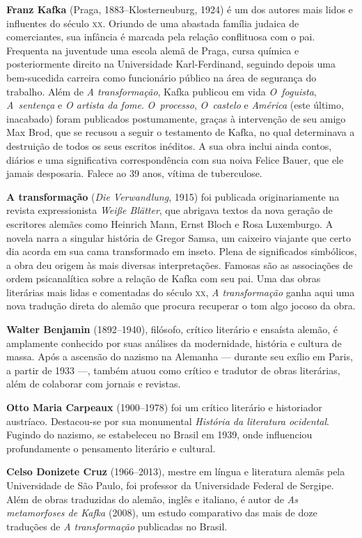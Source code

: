 \textbf{Franz Kafka} (Praga, 1883--Klosterneuburg, 1924) é um dos autores mais lidos 
e influentes do século \textsc{xx}. Oriundo de uma abastada família judaica de
comerciantes, sua infância é marcada pela relação conflituosa com o pai.
Frequenta na juventude uma escola alemã de Praga, cursa química e
posteriormente direito na Universidade Karl{}-Ferdinand, seguindo depois 
uma bem{}-sucedida carreira como funcionário público na área de segurança do trabalho. 
Além de \textit{A transformação}, Kafka publicou em vida \textit{O~foguista}, \textit{A~sentença} e \textit{O artista da fome}. \textit{O~processo}, \textit{O~castelo} e \textit{América} 
(este último, inacabado) foram publicados postumamente, graças à intervenção de 
seu amigo Max Brod, que se recusou a seguir o testamento de Kafka, no qual 
determinava a destruição de todos os seus escritos inéditos. A sua obra inclui
ainda contos, diários e uma significativa correspondência com sua noiva Felice
Bauer, que ele jamais desposaria. Falece ao 39 anos, vítima de tuberculose.

\textbf{A transformação} (\textit{Die Verwandlung}, 1915) foi publicada
originariamente na revista expressionista \textit{Weiße Blätter}, que abrigava
textos da nova geração de escritores alemães como Heinrich Mann, Ernst Bloch e
Rosa Luxemburgo. A novela narra a singular história de Gregor Samsa, um caixeiro
viajante que certo dia acorda em sua cama transformado em inseto. Plena de
significados simbólicos, a obra deu origem às mais diversas interpretações.
Famosas são as associações de ordem psicanalítica sobre a relação de Kafka 
com seu pai. Uma das obras literárias mais lidas e comentadas do século \textsc{xx}, \textit{A transformação} ganha aqui uma nova tradução direta do alemão que procura recuperar o tom algo jocoso da obra.

        
\textbf{Walter Benjamin} (1892--1940), filósofo, crítico literário e ensaísta alemão, é amplamente conhecido por suas análises da modernidade, história e cultura de massa. Após a ascensão do nazismo na Alemanha --- durante seu exílio em Paris, a partir de 1933 ---, também atuou como crítico e tradutor de obras literárias, além de colaborar com jornais e revistas.

\textbf{Otto Maria Carpeaux} (1900--1978) foi um crítico literário e historiador austríaco. Destacou-se por sua monumental \textit{História da literatura ocidental}. Fugindo do nazismo, se estabeleceu no Brasil em 1939, onde influenciou profundamente o pensamento literário e cultural.

\textbf{Celso Donizete Cruz} (1966--2013), mestre em língua e literatura alemãs pela Universidade de São Paulo, foi professor da Universidade Federal de Sergipe. Além de obras traduzidas do alemão, inglês e italiano, é autor de \textit{As metamorfoses de Kafka} (2008), um estudo comparativo das mais de doze traduções de \textit{A transformação} publicadas no Brasil.

